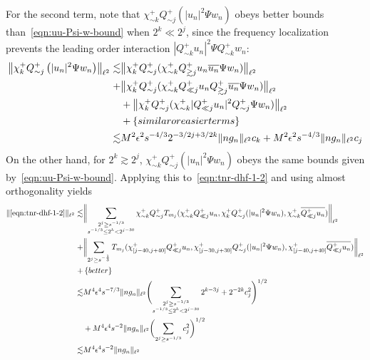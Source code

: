 \documentclass[letterpaper, reqno,final]{amsart}
\newcommand{\discrAvg}{\Psi}
\newcommand{\btext}[1]{\left\{\textup{#1}\right\}}
\newcommand{\bbetter}{\btext{better}}
\newcommand{\bsime}{\btext{similar or easier terms}}
\begin{document}
For the second term, note that $\chi_{\sim k}^+ Q^+_{\sim j} (|u_n|^2 \discrAvg w_n)$ obeys better bounds than~\eqref{eqn:uu-Psi-w-bound} when ${2^k \ll 2^j}$, since the frequency localization prevents the leading order interaction $|Q^+_{\sim k} u_n|^2 \discrAvg Q^+_{\sim k} w_n$:
\begin{equation}\label{eqn:uu-Psi-w-bound-refined}\begin{split}
    \bigl\lVert \chi_{k}^+ Q^+_{\sim j} \left( |u_n|^2 \discrAvg w_n \right) \bigr\rVert_{\ell^2} \lesssim& \bigl\lVert \chi_{k}^+ Q^+_{\sim j} ( \chi_{\sim k}^+ Q^+_{\gtrsim j} u_n \overline{u_n} \discrAvg w_n ) \bigr\rVert_{\ell^2}\\
    +& \bigl\lVert \chi_{k}^+ Q^+_{\sim j} ( \chi_{\sim k}^+ Q^+_{\ll j} u_n Q^+_{\gtrsim j} \overline{u_n} \discrAvg w_n ) \bigr\rVert_{\ell^2}\\
    &+ \bigl\lVert \chi_{k}^+ Q^+_{\sim j} ( \chi_{\sim k}^+ |Q^+_{\ll j} u_n|^2 Q^+_{\sim j}\discrAvg w_n ) \bigr\rVert_{\ell^2}\\
    &+ \bsime\\
    \lesssim& M^2\epsilon^2 s^{-4/3} 2^{-3/2j + 3/2 k} \lVert  n g_n \rVert_{\ell^2} c_k + M^2 \epsilon^2 s^{-4/3} \lVert n g_n \rVert_{\ell^2} c_j
\end{split}\end{equation}
On the other hand, for $2^k \gtrsim 2^j$, $\chi_{\sim k}^+ Q^+_{\sim j} (|u_n|^2 \discrAvg w_n)$ obeys the same bounds given by~\eqref{eqn:uu-Psi-w-bound}.  Applying this to~\eqref{eqn:tnr-dhf-1-2} and using almost orthogonality yields
\begin{equation*}\begin{split}
    \lVert \eqref{eqn:tnr-dhf-1-2} \rVert_{\ell^2} \lesssim& \biggl\lVert \sum_{\substack{2^j \geq s^{-1/3}\\ s^{-1/3} \leq 2^k < 2^{j-30}}}  \chi_{\sim k}^+ Q_{\sim j}^+ T_{m_j}(\chi_{\sim k}^+ Q_{\ll j}^+ u_n, \chi_k^+ Q_{\sim j}^+ (|u_n|^2 \Psi w_n), \chi_{\sim k}^+ \overline{Q_{\ll j}^+ u_n})\biggr\rVert_{\ell^2}\\
    +& \biggl\lVert \sum_{2^j \geq s^{-\frac{1}{3}}}  T_{m_j}(\chi_{[j-40, j+40]}^+ Q_{\ll j}^+ u_n, \chi_{[j-30, j+30]}^+ Q_{\sim j}^+ (|u_n|^2 \Psi w_n), \chi_{[j-40, j+40]}^+ \overline{Q_{\ll j}^+ u_n})\biggr\rVert_{\ell^2}\\
    +& \bbetter\\
    \lesssim& M^4\epsilon^4 s^{-7/3}\lVert n g_n \rVert_{\ell^2}\Biggl( \sum_{\substack{2^j \geq s^{-1/3}\\ s^{-1/3} \leq 2^k < 2^{j-30}}} 2^{k-3j} + 2^{-2k} c_j^2\Biggr)^{1/2}\\
    &+ M^4\epsilon^4 s^{-2} \lVert ng_n \rVert_{\ell^2} \biggl( \sum_{2^j \geq s^{-1/3}} c_j^2\biggr)^{1/2}\\
    \lesssim& M^4\epsilon^4 s^{-2}\lVert ng_n \rVert_{\ell^2}
\end{split}\end{equation*}
\end{document}
